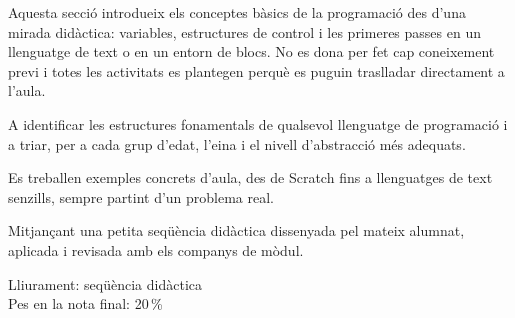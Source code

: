\accentfolio
{}



\vspace{4mm}
Aquesta secció introdueix els conceptes bàsics de la programació des
d'una mirada didàctica: variables, estructures de control i les
primeres passes en un llenguatge de text o en un entorn de blocs. No
es dona per fet cap coneixement previ i totes les activitats es
plantegen perquè es puguin traslladar directament a l'aula.

\vspace{5mm}
\columndivider{75.5mm}{112mm}{195mm}

\noindent
\begin{minipage}[t]{0.47\textwidth}
A identificar les estructures fonamentals de qualsevol llenguatge de
programació i a triar, per a cada grup d'edat, l'eina i el nivell
d'abstracció més adequats.

Es treballen exemples concrets d'aula, des de Scratch fins a
llenguatges de text senzills, sempre partint d'un problema real.
\end{minipage}%
\hfill
\begin{minipage}[t]{0.47\textwidth}
Mitjançant una petita seqüència didàctica dissenyada pel mateix
alumnat, aplicada i revisada amb els companys de mòdul.

\vspace{2mm}
{\small
Lliurament: seqüència didàctica\\
Pes en la nota final: 20\,\%
}
\end{minipage}
